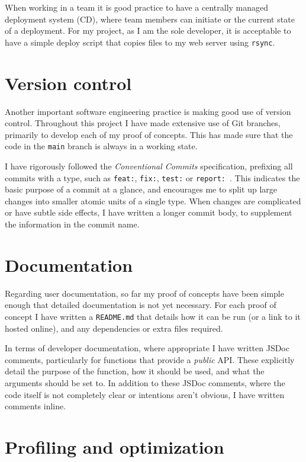 \documentclass[hyphens]{final_report}
\begin{document}
When working in a team it is good practice to have a centrally managed deployment system (CD), where team members can initiate or the current state of a deployment. For my project, as I am the sole developer, it is acceptable to have a simple deploy script that copies files to my web server using \texttt{rsync}.

\section{Version control}

Another important software engineering practice is making good use of version control. Throughout this project I have made extensive use of Git branches, primarily to develop each of my proof of concepts. This has made sure that the code in the \texttt{main} branch is always in a working state.

I have rigorously followed the \emph{Conventional Commits} specification, prefixing all commits with a type, such as \texttt{feat:}, \texttt{fix:}, \texttt{test:} or \texttt{report:}~\cite{conventional-commits}. This indicates the basic purpose of a commit at a glance, and encourages me to split up large changes into smaller atomic units of a single type. When changes are complicated or have subtle side effects, I have written a longer commit body, to supplement the information in the commit name.

\section{Documentation}

Regarding user documentation, so far my proof of concepts have been simple enough that detailed documentation is not yet necessary. For each proof of concept I have written a \texttt{README.md} that details how it can be run (or a link to it hosted online), and any dependencies or extra files required.

In terms of developer documentation, where appropriate I have written JSDoc comments, particularly for functions that provide a \emph{public} API\@. These explicitly detail the purpose of the function, how it should be used, and what the arguments should be set to. In addition to these JSDoc comments, where the code itself is not completely clear or intentions aren't obvious, I have written comments inline.

\section{Profiling and optimization}\label{sec:profiling}
\end{document}
